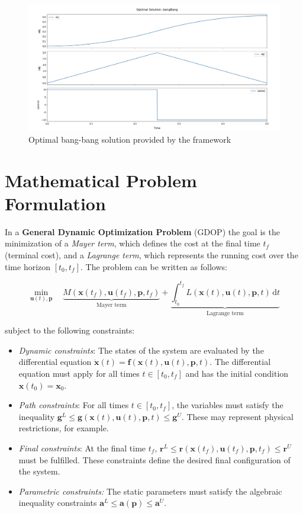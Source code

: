 \documentclass[12pt]{article}
\newcommand{\dd}{\mathrm{d}}
\renewcommand{\v}{\bm}
\begin{document}
\begin{figure}[H]
	\centering
	\includegraphics[width=\textwidth]{images/bangBang.png}
	\caption{Optimal bang-bang solution provided by the framework}
	\label{fig:bangBang}
\end{figure}
\section{Mathematical Problem Formulation}
\label{c:GDOP}

In a \textbf{General Dynamic Optimization Problem} (GDOP) the goal is the minimization of a \textit{Mayer term}, which defines the cost at the final time $t_f$ (terminal cost), and a \textit{Lagrange term}, which represents the running cost over the time horizon $[t_0, t_f]$. The problem can be written as follows:

\begin{equation*}
	\min_{\v{u}(t), \v{p}} \quad \underbrace{M(\v{x}(t_f), \v{u}(t_f), \v{p}, t_f)}_{\text{Mayer term}} + \underbrace{\int_{t_0}^{t_f} L(\v{x}(t), \v{u}(t), \v{p}, t)\, \dd t}_{\text{Lagrange term}}
\end{equation*}

subject to the following constraints:

\begin{itemize}
	\item \textit{Dynamic constraints}:  
	The states of the system are evaluated by the differential equation $\dot{\v{x}}(t) = \v{f}(\v{x}(t), \v{u}(t), \v{p}, t)$. The differential equation must apply for all times $t \in [t_0, t_f]$ and has the initial condition $\v{x}(t_0) = \v{x}_0$.
	
	\item \textit{Path constraints}:  
	For all times $t \in [t_0, t_f]$, the variables must satisfy the inequality $\v{g}^L \leq \v{g}(\v{x}(t), \v{u}(t), \v{p}, t) \leq \v{g}^U$. These may represent physical restrictions, for example.
	
	\item \textit{Final constraints}:  
	At the final time $t_f$, $\v{r}^L \leq \v{r}(\v{x}(t_f), \v{u}(t_f), \v{p}, t_f) \leq \v{r}^U$ must be fulfilled. These constraints define the desired final configuration of the system.
	
	\item \textit{Parametric constraints:}  
	The static parameters must satisfy the algebraic inequality constraints $\v{a}^L \leq \v{a}(\v{p}) \leq \v{a}^U$.
\end{itemize}
\end{document}
